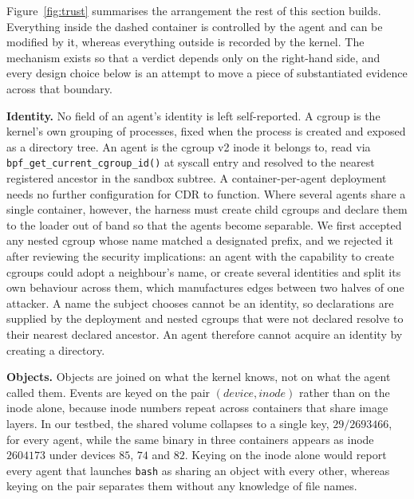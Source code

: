 \documentclass[11pt]{article}
\begin{document}
Figure~\ref{fig:trust} summarises the arrangement the rest of this section builds. Everything inside the dashed container is controlled by the agent and can be modified by it, whereas everything outside is recorded by the kernel. The mechanism exists so that a verdict depends only on the right-hand side, and every design choice below is an attempt to move a piece of substantiated evidence across that boundary.

\noindent\textbf{Identity.} No field of an agent's identity is left self-reported. A cgroup is the kernel's own grouping of processes, fixed when the process is created and exposed as a directory tree. An agent is the cgroup v2 inode it belongs to, read via \texttt{bpf\_get\_current\_cgroup\_id()} at syscall entry and resolved to the nearest registered ancestor in the sandbox subtree. A container-per-agent deployment needs no further configuration for CDR to function. Where several agents share a single container, however, the harness must create child cgroups and declare them to the loader out of band so that the agents become separable. We first accepted any nested cgroup whose name matched a designated prefix, and we rejected it after reviewing the security implications: an agent with the capability to create cgroups could adopt a neighbour's name, or create several identities and split its own behaviour across them, which manufactures edges between two halves of one attacker. A name the subject chooses cannot be an identity, so declarations are supplied by the deployment and nested cgroups that were not declared resolve to their nearest declared ancestor. An agent therefore cannot acquire an identity by creating a directory.

\noindent\textbf{Objects.} Objects are joined on what the kernel knows, not on what the agent called them. Events are keyed on the pair $(\mathit{device},\mathit{inode})$ rather than on the inode alone, because inode numbers repeat across containers that share image layers. In our testbed, the shared volume collapses to a single key, $29/2693466$, for every agent, while the same binary in three containers appears as inode $2604173$ under devices $85$, $74$ and $82$. Keying on the inode alone would report every agent that launches \texttt{bash} as sharing an object with every other, whereas keying on the pair separates them without any knowledge of file names.
\end{document}
